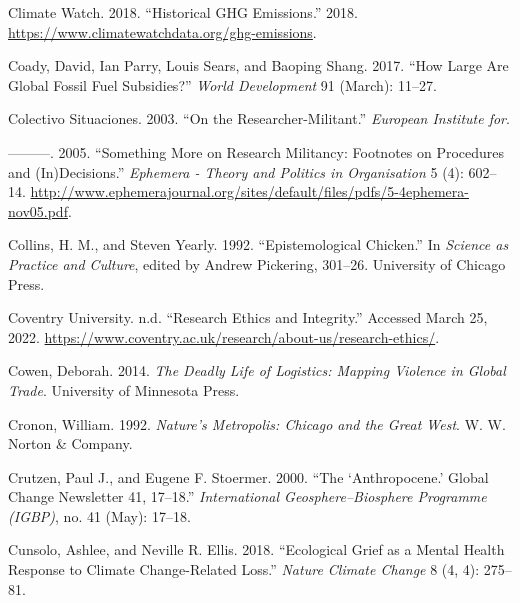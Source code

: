 \documentclass[a4paper, nobind]{templates/ociamthesis}
\newlength{\cslhangindent}
\newenvironment{CSLReferences}[2] %
 {%
  \setlength{\parindent}{0pt}
  \ifodd #1
  \let\oldpar\par
  \def\par{\hangindent=\cslhangindent\oldpar}
  \fi
  \setlength{\parskip}{1mm}
  \setlength{\baselineskip}{6mm}
 }%
 {}
\begin{document}
\begin{CSLReferences}{1}{0}
\leavevmode{}%
Climate Watch. 2018. {``Historical {GHG Emissions}.''} 2018. \url{https://www.climatewatchdata.org/ghg-emissions}.

\leavevmode{}%
Coady, David, Ian Parry, Louis Sears, and Baoping Shang. 2017. {``How {Large Are Global Fossil Fuel Subsidies}?''} \emph{World Development} 91 (March): 11--27.

\leavevmode{}%
Colectivo Situaciones. 2003. {``On the {Researcher-Militant}.''} \emph{European Institute for}.

\leavevmode{}%
---------. 2005. {``Something {More} on {Research Militancy}: {Footnotes} on {Procedures} and ({In}){Decisions}.''} \emph{Ephemera - Theory and Politics in Organisation} 5 (4): 602--14. \url{http://www.ephemerajournal.org/sites/default/files/pdfs/5-4ephemera-nov05.pdf}.

\leavevmode{}%
Collins, H. M., and Steven Yearly. 1992. {``Epistemological {Chicken}.''} In \emph{Science as {Practice} and {Culture}}, edited by Andrew Pickering, 301--26. {University of Chicago Press}.

\leavevmode{}%
Coventry University. n.d. {``Research {Ethics} and {Integrity}.''} Accessed March 25, 2022. \url{https://www.coventry.ac.uk/research/about-us/research-ethics/}.

\leavevmode{}%
Cowen, Deborah. 2014. \emph{The {Deadly Life} of {Logistics}: {Mapping Violence} in {Global Trade}}. {University of Minnesota Press}.

\leavevmode{}%
Cronon, William. 1992. \emph{Nature's {Metropolis}: {Chicago} and the {Great West}}. {W. W. Norton \& Company}.

\leavevmode{}%
Crutzen, Paul J., and Eugene F. Stoermer. 2000. {``The {`{Anthropocene}.'} {Global Change Newsletter} 41, 17--18.''} \emph{International Geosphere--Biosphere Programme (IGBP)}, no. 41 (May): 17--18.

\leavevmode{}%
Cunsolo, Ashlee, and Neville R. Ellis. 2018. {``Ecological Grief as a Mental Health Response to Climate Change-Related Loss.''} \emph{Nature Climate Change} 8 (4, 4): 275--81.


\end{CSLReferences}
\end{document}
